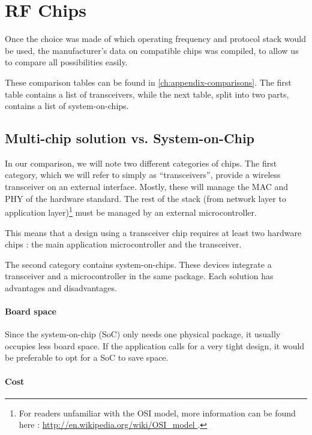 \section{RF Chips}\label{sec:chips}

Once the choice was made of which operating frequency and protocol stack would
be used, the manufacturer's data on compatible chips was compiled, to allow us
to compare all possibilities easily. 

These comparison tables can be found in \autoref{ch:appendix-comparisons}. The
first table contains a list of transceivers, while the next table, split into
two parts, contains a list of system-on-chips.

\subsection{Multi-chip solution vs. System-on-Chip}

In our comparison, we will note two different categories of chips. The first
category, which we will refer to simply as ``transceivers'', provide a wireless
transceiver on an external interface. Mostly, these will manage the MAC and PHY
of the hardware standard. The rest of the stack (from network layer to
application layer)\footnote{For readers unfamiliar with the OSI model, more
information can be found here : \url{ http://en.wikipedia.org/wiki/OSI_model }.}
must be managed by an external microcontroller. 

This means that a design using a transceiver chip requires at least two hardware
chips : the main application microcontroller and the transceiver.

The second category contains system-on-chips. These devices integrate
a transceiver and a microcontroller in the same package. Each solution has
advantages and disadvantages.

\paragraph{Board space} 

Since the system-on-chip (SoC) only needs one physical package, it usually
occupies less board space. If the application calls for a very tight design, it
would be preferable to opt for a SoC to save space.

\paragraph{Cost} 

